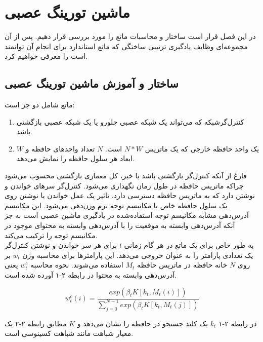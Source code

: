 \chapter{ماشین تورینگ عصبی}
در این فصل قرار است ساختار و محاسبات ماتع را مورد بررسی قرار دهیم. پس از آن مجموعه‌ای وظایف یادگیری ترتیبی ساختگی که ماتع استاندارد برای انجام آن توانمند است را معرفی خواهیم کرد.

\section{ساختار و آموزش ماشین تورینگ عصبی}
ماتع شامل دو جز است:
\begin{enumerate}
\item کنترل‌گرشبکه که می‌تواند یک شبکه عصبی جلورو  یا یک شبکه عصبی بازگشتی باشد.
\item یک واحد حافظه خارجی که یک ماتریس  $N*W$ است. $N$ تعداد واحد‌های حافظه و $W$ ابعاد هر سلول حافظه را نمایش می‌دهد.\cite{collier2018implementing}
\end{enumerate}

فارغ از آنکه کنترل‌گر بازگشتی باشد یا خیر، کل معماری بازگشتی محسوب می‌شود چراکه ماتریس حافظه در طول زمان نگهداری می‌شود. کنترل‌گر سرهای خواندن و نوشتن دارد که به ماتریس حافظه دسترسی دارد. تاثیر یک عمل خواندن یا نوشتن روی یک سلول حافظه خاص با مکانیسم توجه نرم وزن‌دهی می‌شود. این مکانیسم آدرس‌دهی مشابه مکانیسم توجه استفاده‌شده در یادگیری ماشین عصبی است به جز آنکه آدرس‌دهی وابسته به موقعیت را با آدرس‌دهی وابسته به محتوای موجود در مکانیسم توجه  را ترکیب می‌کند.\cite{collier2018implementing}
\\

به طور خاص برای یک ماتع در هر گام زمانی $t$ برای هر سر خواندن و نوشتن کنترل‌گر یک تعدادی پارامتر را به عنوان خروجی می‌دهد. این پارامتر‌ها برای محاسبه وزن $w_t$ بر روی $N$ خانه حافظه در ماتریس حافظه $M_t$ استفاده می‌شوند. نحوه محاسبه $w_t^c$ یعنی آدرس‌دهی وابسته به محتوا در رابطه ۲-۱ آورده شده است.\cite{collier2018implementing}

\begin{equation}
w^c_t(i) = \frac{exp(\beta_t K[k_t,M_t(i)])}{\sum_{j=0}^{N-1} exp(\beta_t K[k_t,M_t(j)])}
\end{equation}

در رابطه ۲-۱ $k_t$ یک کلید جستجو در حافظه را نشان می‌دهد و $K$ مطابق رابطه ۲-۲ یک معیار شباهت مانند شباهت کسینوسی است.\cite{collier2018implementing}

